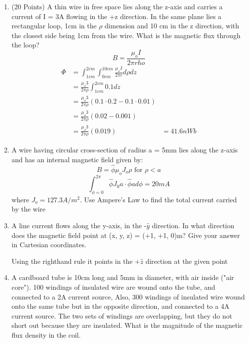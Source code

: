\documentclass{article}
\begin{document}
\begin{enumerate}
    \item (20 Points) A thin wire in free space lies along the z-axis and carries a current of I = 3A flowing in the +z direction. In the same plane lies a rectangular loop, 1cm in the $\rho$ dimension and 10 cm in the z direction, with the closest side being 1cm from the wire. What is the magnetic flux through the loop?
    \begin{equation}
        B = \frac{\mu_oI}{2\pi rho}
    \end{equation}
    \begin{align}
        \Phi &= \int_{1cm}^{2cm} \int_{0cm}^{10cm}  \frac{\mu_oI}{2\pi r} d\rho dz\\
        &= \frac{\mu_o3}{2\pi \rho}\int_{1cm}^{2cm} 0.1dz\\
        &= \frac{\mu_o3}{2\pi \rho}(0.1\cdot0.2 - 0.1 \cdot0.01)\\
        &= \frac{\mu_o3}{2\pi \rho}(0.02 - 0.001)\\
        &= \frac{\mu_o3}{2\pi \rho}(0.019)
        &= \boxed{41.6 nWb}
    \end{align}
    \item A wire having circular cross-section of radius a = 5mm lies along the z-axis and has an internal magnetic field given by:
    \begin{equation}
        B = \hat{\phi}\mu_oJ_o\rho\text{ for } \rho < a
    \end{equation}
    \begin{equation}
        \int_{\phi = 0}^{2\pi}\hat{\phi}J_0a\cdot\hat{\phi}ad\phi = \boxed{20mA}
    \end{equation}
    where $J_o = 127.3 A/m^2$. Use Ampere's Law to find the total current carried by the wire
    \item A line current flows along the y-axis, in the -$\hat{y}$ direction. In what direction does the magnetic field point at (x, y, z) = (+1, +1, 0)m? Give your answer in Cartesian coordinates.
    \begin{center}
        Using the righthand rule it points in the $\boxed{+\hat{z}}$ direction at the given point
    \end{center}
    \item A cardboard tube is 10cm long and 5mm in diameter, with air inside ("air core"). 100 windings of insulated wire are wound onto the tube, and connected to a 2A current source, Also, 300 windings of insulated wire wound onto the same tube but in the opposite direction, and connected to a 4A current source. The two sets of windings are overlapping, but they do not short out because they are insulated. What is the magnitude of the magnetic flux density in the coil.

\end{enumerate}
\end{document}
